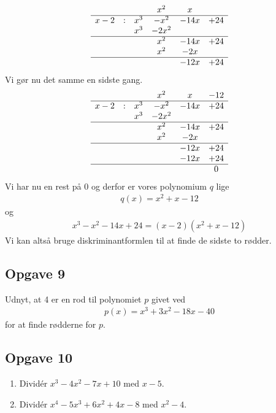 \begin{exa}
\begin{align*}
\begin{array}{cccccc}
			& & & x^2 & x & 		\\
			\hline
			x-2 & : & x^3 & - x^2 & -14x & +24 \\
			& &x^3 & -2x^2 &  &   \\
			\hline
			& & & x^2 & -14x & +24 \\
			& & & x^2 & -2x & \\
			\hline 
			& & & & -12x & +24 \\
		\end{array}
	\end{align*}
	Vi gør nu det samme en sidste gang. 
	\begin{align*}
		\begin{array}{cccccc}
			& & & x^2 & x & 	-12	\\
			\hline
			x-2 & : & x^3 & - x^2 & -14x & +24 \\
			& &x^3 & -2x^2 &  &   \\
			\hline
			& & & x^2 & -14x & +24 \\
			& & & x^2 & -2x & \\
			\hline 
			& & & & -12x & +24 \\
			& & & & -12x & +24 \\
			\hline 
			& & & & & 0
		\end{array}
	\end{align*}
	Vi har nu en rest på 0 og derfor er vores polynomium $q$ lige
	\begin{align*}
		q(x) = x^2 + x - 12
	\end{align*}
	og 
	\begin{align*}
		x^3 - x^2 - 14x + 24 = (x-2)(x^2 + x -12)
	\end{align*}
	Vi kan altså bruge diskriminantformlen til at finde de sidste to rødder.
\end{exa}
\subsection*{Opgave 9}
Udnyt, at 4 er en rod til polynomiet $p$ givet ved
\begin{align*}
	p(x) = x^3 + 3 x^2 - 18 x - 40
\end{align*}
for at finde rødderne for $p$. 
\subsection*{Opgave 10}
\begin{enumerate}[label=\roman*)]
	\item Dividér $x^3 - 4x^2 -7x + 10$ med $x-5$.
	\item Dividér $x^4 - 5x^3 + 6x^2 + 4x - 8$ med $x^2 - 4$.
\end{enumerate}